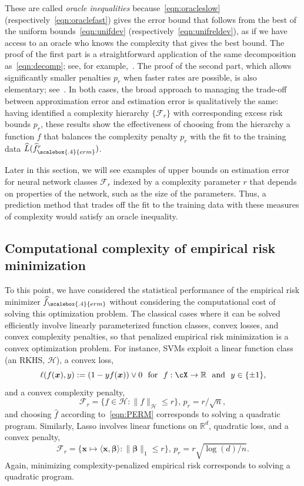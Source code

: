 These are called {\em oracle inequalities}
because~\eqref{eqn:oracleslow} (respectively~\eqref{eqn:oraclefast})
gives the error bound that follows from the best of the uniform
bounds~\eqref{eqn:unifdev} (respectively~\eqref{eqn:unifreldev}), as if we have access to an oracle who knows the complexity that gives the best bound.  The proof of the first part is a straightforward application of the same decomposition as~\eqref{eqn:decomp}; see, for example,~\cite{bbl-msee-02}. The proof of the second part, which allows significantly smaller penalties $p_r$ when faster rates are possible, is also elementary; see~\cite{b-freeoims-07}.  In both cases, the broad approach to managing the trade-off between approximation error and estimation error is qualitatively the same: having identified a complexity hierarchy $\{{\mathcal F}_r\}$ with corresponding excess risk bounds $p_r$, these results show the effectiveness of choosing from the hierarchy a function $f$ that balances the complexity penalty $p_r$ with the fit to the training data $\widehat L(\widehat{f}_{\scalebox{.4}{erm}}^r)$.

Later in this section, we will see examples of upper bounds on estimation error for neural network classes ${\mathcal F}_r$ indexed by a complexity parameter $r$ that depends on properties of the network, such as the size of the parameters. Thus, a prediction method that trades off the fit to the training data with these measures of complexity would satisfy an oracle inequality.

\subsection{Computational complexity of empirical risk minimization}
\label{sec:Intractability}

To this point, we have considered the statistical performance of the empirical risk minimizer $\widehat{f}_{\scalebox{.4}{erm}}$ without considering the computational cost of solving this optimization problem.  The classical cases where it can be solved efficiently involve linearly parameterized function classes, convex losses, and convex complexity penalties, so that penalized empirical risk minimization is a convex optimization problem.  For instance, SVMs exploit a linear function class (an RKHS, ${\mathcal H}$), a convex loss, 
	\[
		\ell(f({\boldsymbol x}),y) := (1-yf({\boldsymbol x}))\vee 0 ~~\text{for}~~ f:\cX\to{\mathbb R} ~~\text{and}~~ y\in\{\pm 1\}, 
	\] 
and a convex complexity penalty, 
	\[
		{\mathcal F}_r=\{f\in{\mathcal H}:\|f\|_{{\mathcal H}}\le r\},\, p_r=r/\sqrt n,
	\] 
and choosing $\widehat f$ according to~\eqref{eqn:PERM} corresponds to solving a quadratic program. Similarly, Lasso involves linear functions on ${\mathbb R}^d$, quadratic loss, and a convex penalty,
	\[
		{\mathcal F}_r=\{{\boldsymbol x}\mapsto \langle{\boldsymbol x},{\boldsymbol \beta}\rangle:\|{\boldsymbol \beta}\|_1\le r\},\,
p_r=r\sqrt{\log(d)/n}.
\] 
Again, minimizing complexity-penalized empirical risk corresponds to solving a quadratic program.

